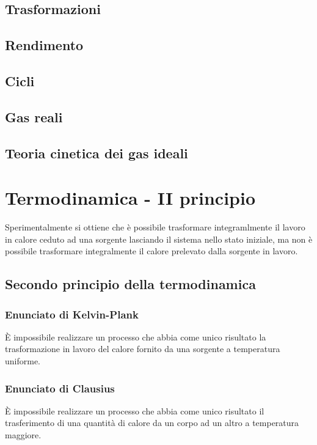 \documentclass[x11names]{report}
\begin{document}
\section{Trasformazioni}
\section{Rendimento}
\section{Cicli}
\section{Gas reali}
\section{Teoria cinetica dei gas ideali}



\chapter{Termodinamica - II principio}
Sperimentalmente si ottiene che è possibile trasformare integramlmente il lavoro in calore ceduto ad una sorgente lasciando il sistema nello stato iniziale, ma non è possibile trasformare integralmente il calore prelevato dalla sorgente in lavoro.

\section{Secondo principio della termodinamica}
\begin{center}
	\colorbox{yred}{\begin{minipage}{5.75in}
			\begin{redes}{}
				\subsection{Enunciato di Kelvin-Plank}
				È impossibile realizzare un processo che abbia come unico risultato la trasformazione in lavoro del calore fornito da una sorgente a temperatura uniforme.
				\vspace{0.2cm}
				\subsection{Enunciato di Clausius}
				È impossibile realizzare un processo che abbia come unico risultato il trasferimento di una quantità di calore da un corpo ad un altro a temperatura maggiore.
			\end{redes}
	\end{minipage}}
\end{center}
\end{document}

